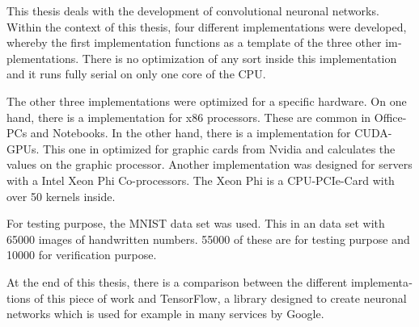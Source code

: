 \documentclass[../main.tex]{subfiles}
\begin{document}
\begin{otherlanguage}{english}
This thesis deals with the development of convolutional neuronal networks. Within the context of this thesis, four different implementations were developed, whereby the first implementation functions as a template of the three other implementations. There is no optimization of any sort inside this implementation and it runs fully serial on only one core of the CPU.

The other three implementations were optimized for a specific hardware. On one hand, there is a implementation for x86 processors. These are common in Office-PCs and Notebooks. In the other hand, there is a implementation for CUDA-GPUs. This one in optimized for graphic cards from Nvidia and calculates the values on the graphic processor. Another implementation was designed for servers with a Intel Xeon Phi Co-processors. The Xeon Phi is a CPU-PCIe-Card with over 50 kernels inside.

For testing purpose, the MNIST data set was used. This in an data set with 65000 images of handwritten numbers. 55000 of these are for testing purpose and 10000 for verification purpose.

At the end of this thesis, there is a comparison between the different implementations of this piece of work and TensorFlow, a library designed to create neuronal networks which is used for example in many services by Google.
\end{otherlanguage}
\end{document}
